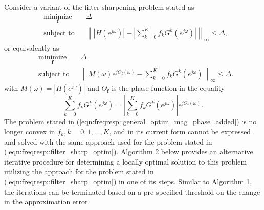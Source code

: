 \documentclass[journal] {IEEEtran}
\begin{document}
Consider a variant of the filter sharpening problem stated as
\begin{equation}\label{eqn:freqresp::filter_sharp_optim_mag}
\begin{aligned}
& \underset{\mathbf{f}}{\text{minimize}}
& & \Delta \\
& \text{subject to}
& &\left\|\left|H(e^{j\omega})\right|-\left|\sum_{k=0}^K f_k G^k(e^{j\omega})\right|\right\|_{\infty}\le \Delta,
\end{aligned}
\end{equation}
or equivalently as
 \begin{equation}\label{eqn:freqresp::general_optim_mag_phase_added}
\begin{aligned}
& \underset{\mathbf{f}}{\text{minimize}}
& & \Delta \\
& \text{subject to}
& &\left\| M(\omega)e^{j\Theta_{\mathbf{f}}(\omega)}-\sum_{k=0}^K f_k G^k(e^{j\omega})\right\|_{\infty}\le \Delta.
\end{aligned}
\end{equation}
with $M(\omega)=|H(e^{j\omega})|$ and $\Theta_{\mathbf{f}}$ is the phase function in the equality
\begin{equation}\label{eqn:freqresp::theta_def}
 \sum_{k=0}^K f_k G^k(e^{j\omega})=\left|\sum_{k=0}^K f_k G^k(e^{j\omega})\right|e^{j\Theta_{\mathbf{f}}(\omega)}.
\end{equation}
The problem stated in (\ref{eqn:freqresp::general_optim_mag_phase_added}) is no longer convex in $f_k,k=0,1,\dots,K$, and in its current form cannot be expressed and solved with the same approach used for the problem stated in (\ref{eqn:freqresp::filter_sharp_optim}). Algorithm 2 below provides an alternative iterative procedure for determining a locally optimal solution to this problem utilizing the approach for the problem stated in (\ref{eqn:freqresp::filter_sharp_optim}) in one of its steps. Similar to Algorithm 1, the iterations can be terminated based on a pre-specified threshold on the change in the approximation error.
\end{document}
